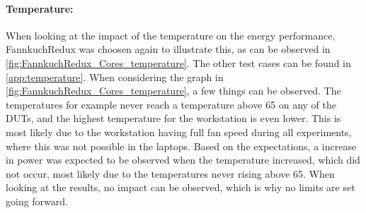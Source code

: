 


\paragraph{Temperature:} When looking at the impact of the temperature on the energy performance, FannkuchRedux was choosen again to illustrate this, as can be observed in \cref*{fig:FannkuchRedux_Cores_temperature}. The other test cases can be found in \cref*{app:temperature}. When considering the graph in \cref{fig:FannkuchRedux_Cores_temperature}, a few things can be observed. The temperatures for example never reach a temperature above 65 on any of the DUTs, and the highest temperature for the workstation is even lower. This is most likely due to the workstation having full fan speed during all experiments, where this was not possible in the laptops. Based on the expectations, a increase in power was expected to be observed when the temperature increased, which did not occur, most likely due to the temperatures never rising above 65. When looking at the results, no impact can be observed, which is why no limits are set going forward.





